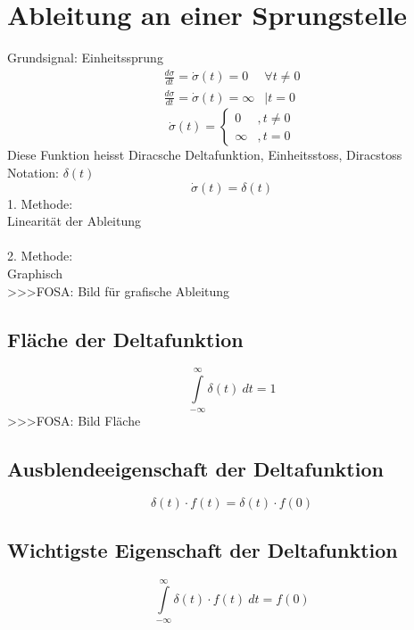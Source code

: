 \section{Ableitung an einer Sprungstelle}
Grundsignal: Einheitssprung\\
\[ \boxed{\begin{array}{ll}
\frac{d \sigma}{d t} = \dot{\sigma}(t) = 0 & \forall t \neq 0 \\
\frac{d \sigma}{d t} = \dot{\sigma}(t) = \infty & | t =   0
\end{array}
} \]
\[ \boxed{\dot{\sigma}(t) = \left\lbrace 
\begin{array}{ll}0&, t \neq 0\\\infty&, t = 0\end{array} \right.} \]
Diese Funktion heisst Diracsche Deltafunktion, Einheitsstoss, Diracstoss\\
Notation: $\delta(t)$
\[ \boxed{\dot{\sigma}(t) = \delta(t)} \]
1. Methode: \\
Linearität der Ableitung\\\\
2. Methode: \\
Graphisch\\
>>>FOSA: Bild für grafische Ableitung\\

\subsection{Fläche der Deltafunktion}
\[ \boxed{\int\limits_{-\infty}^{\infty} \delta(t) ~ dt = 1} \]
>>>FOSA: Bild Fläche

\subsection{Ausblendeeigenschaft der Deltafunktion}
\[ \boxed{\delta(t) \cdot f(t) = \delta(t) \cdot f(0)} \]

\subsection{Wichtigste Eigenschaft der Deltafunktion}
\[ \boxed{\int\limits_{-\infty}^{\infty} \delta(t) \cdot f(t) ~ dt = f(0)} \]
